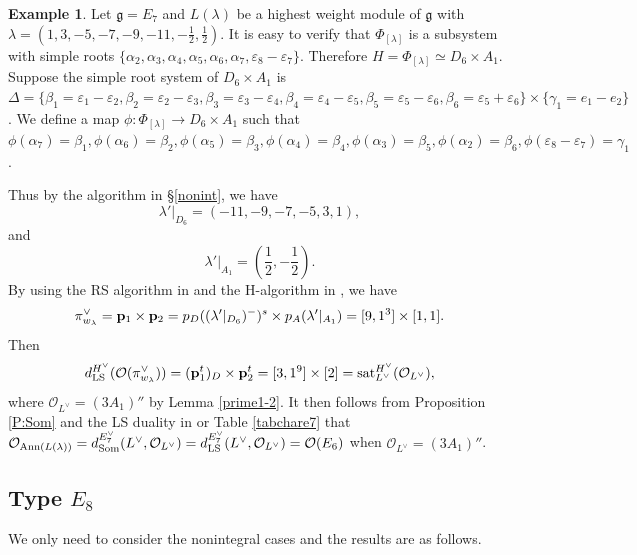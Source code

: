 \documentclass[reqno,12pt]{amsart}
\numberwithin{equation}{section}
\theoremstyle{plain}
\theoremstyle{definition}
\newtheorem{ex}[Thm]{Example}
\newcommand{\lam}{\lambda}
\newcommand{\ep}{\varepsilon}
\newcommand{\Ann}{\mathrm{Ann}}
\newcommand{\aff}{ \mathbf{a} }
\newcommand{\gkd}{\operatorname{GKdim}}
\begin{document}
\begin{ex}
    Let $\mathfrak{g}=E_7$ and $L(\lam)$ be a highest weight module of $\mathfrak{g}$ with  $\lambda=(1,3,-5,-7,-9,-11, -\frac{1}{2}, \frac{1}{2})$. It is easy to verify that $\Phi_{[\lambda]}$ is a subsystem with simple roots $\{ \alpha_2,\alpha_3,\alpha_4,\alpha_5,\alpha_6,\alpha_7,\ep_8-\ep_7\}$. Therefore $H=\Phi_{[\lambda]}\simeq D_6\times A_1$. Suppose the simple root system of $D_6\times A_1$ is $\Delta=\{\beta_1=\ep_1-\ep_2, \beta_2=\ep_2-\ep_3, \beta_3=\ep_3-\ep_4,  \beta_4=\ep_4-\ep_5, \beta_5=\ep_5-\ep_6, \beta_6=\ep_5+\ep_6\}\times \{\gamma_1=e_1-e_2\}$.
    We define a map $\phi: \Phi_{[\lambda]} \rightarrow D_6\times A_1$ such that $\phi(\alpha_7)=\beta_1, \phi(\alpha_6)=\beta_2, \phi(\alpha_5)=\beta_3, \phi(\alpha_4)=\beta_4,\phi(\alpha_3)=\beta_5,\phi(\alpha_2)=\beta_6,\phi(\ep_8-\ep_7)=\gamma_1$.

   Thus by the algorithm in \S \ref{nonint},
   we have $$\lam'|_{D_6}=(-11,-9,-7,-5,3,1),$$
   and $$\lam'|_{A_1}= (\frac{1}{2},-\frac{1}{2}).$$
By using the RS algorithm in \cite{BXX} and the H-algorithm in \cite{BMW}, we have
$$\pi^{\vee}_{w_{\lam}}={\bf p}_{1}\times {\bf p}_{2}=p_{D}((\lam'|_{D_6})^-)^s\times p_{A}(\lam'|_{A_1})=[9,1^3]\times [1,1].$$ Then 
$$d_{\rm LS}^{H^\vee} (\mathcal{O}(\pi_{w_{\lam}}^\vee))=({\bf p}_{1}^t)_D \times {\bf p}^t_{2} =[3,1^9]\times [2]= {\rm sat}_{L^\vee}^{H^\vee} (\mathcal{O}_{L^\vee}),$$
where $\mathcal{O}_{L^\vee}=(3A_1)'' $ by Lemma \ref{prime1-2}. 
It then follows from Proposition \ref{P:Som} and the LS duality in \cite[p. 443]{Ca85} or Table \ref{tabchare7} that $\mathcal{O}_{{\rm Ann}(L(\lambda))} = d_{\rm Som}^{E_7^\vee}(L^\vee, \mathcal{O}_{L^\vee}) = d_{\rm LS}^{E_7^\vee}(L^\vee, \mathcal{O}_{L^\vee})= \mathcal{O}(E_{6})$ when $\mathcal{O}_{L^\vee}=(3A_1)''$.


\end{ex}

















\subsection{Type \texorpdfstring{$E_8$}{}} We only need to consider the nonintegral cases and the results
are as follows.
\end{document}
